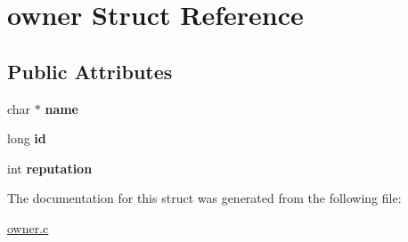 \hypertarget{structowner}{}\section{owner Struct Reference}
\label{structowner}
\subsection*{Public Attributes}
\begin{DoxyCompactItemize}
\item 
char $\ast$ {\bfseries name}\hypertarget{structowner_a3f98082c9cb1b9ebf6bd800cf8f02d7a}{}\label{structowner_a3f98082c9cb1b9ebf6bd800cf8f02d7a}

\item 
long {\bfseries id}\hypertarget{structowner_ae191722b4b1481ceb1448298ee7993f7}{}\label{structowner_ae191722b4b1481ceb1448298ee7993f7}

\item 
int {\bfseries reputation}\hypertarget{structowner_aab96aa77f5a40c94bc71aea8b89b7abf}{}\label{structowner_aab96aa77f5a40c94bc71aea8b89b7abf}

\end{DoxyCompactItemize}


The documentation for this struct was generated from the following file\+:\begin{DoxyCompactItemize}
\item 
\hyperlink{owner_8c}{owner.\+c}\end{DoxyCompactItemize}
